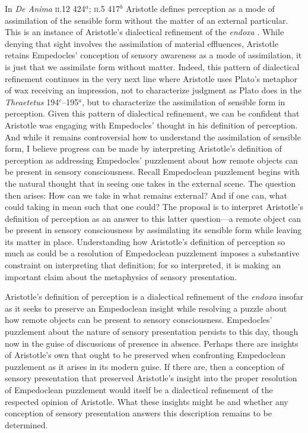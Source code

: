 In \emph{De Anima} \textsc{ii}.12 424\( ^{a} \); \textsc{ii}.5 417\( ^{b} \) Aristotle defines perception as a mode of assimilation of the sensible form without the matter of an external particular. This is an instance of Aristotle's dialectical refinement of the \emph{endoxa} \citep[on Aristotle's dialectic in \emph{De Anima} see][]{Witt:1995kx}. While denying that sight involves the assimilation of material effluences, Aristotle retains Empedocles' conception of sensory awareness as a mode of assimilation, it is just that we assimilate form without matter. Indeed, this pattern of dialectical refinement continues in the very next line where Aristotle uses Plato's metaphor of wax receiving an impression, not to characterize judgment as Plato does in the \emph{Theaetetus} 194\( ^{c} \)--195\( ^{a} \), but to characterize the assimilation of sensible form in perception. Given this pattern of dialectical refinement, we can be confident that Aristotle was engaging with Empedocles' thought in his definition of perception. And while it remains controversial how to understand the assimilation of sensible form, I believe progress can be made by interpreting Aristotle's definition of perception as addressing Empedocles' puzzlement about how remote objects can be present in sensory consciousness. Recall Empedoclean puzzlement begins with the natural thought that in seeing one takes in the external scene. The question then arises: How can we take in what remains external? And if one can, what could taking in mean such that one could? The proposal is to interpret Aristotle's definition of perception as an answer to this latter question---a remote object can be present in sensory consciousness by assimilating its sensible form while leaving its matter in place. Understanding how Aristotle's definition of perception so much as could be a resolution of Empedoclean puzzlement imposes a substantive constraint on interpreting that definition; for so interpreted, it is making an important claim about the metaphysics of sensory presentation.

Aristotle's definition of perception is a dialectical refinement of the \emph{endoxa} insofar as it seeks to preserve an Empedoclean insight while resolving a puzzle about how remote objects can be present to sensory consciousness. Empedocles' puzzlement about the nature of sensory presentation persists to this day, though now in the guise of discussions of presence in absence. Perhaps there are insights of Aristotle's own that ought to be preserved when confronting Empedoclean puzzlement as it arises in its modern guise. If there are, then a conception of sensory presentation that preserved Aristotle's insight into the proper resolution of Empedoclean puzzlement would itself be a dialectical refinement of the respected opinion of Aristotle. What these insights might be and whether any conception of sensory presentation answers this description remains to be determined.


